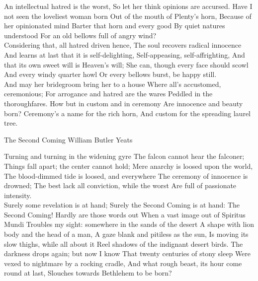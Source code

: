 \begin{poem}
 An intellectual hatred is the worst,
 So let her think opinions are accursed.
 Have I not seen the loveliest woman born
 Out of the mouth of Plenty's horn,
 Because of her opinionated mind
 Barter that horn and every good
 By quiet natures understood
 For an old bellows full of angry wind?\\

 Considering that, all hatred driven hence,
 The soul recovers radical innocence
 And learns at last that it is self-delighting,
 Self-appeasing, self-affrighting,
 And that its own sweet will is Heaven's will;
 She can, though every face should scowl
 And every windy quarter howl
 Or every bellows burst, be happy still.\\

 And may her bridegroom bring her to a house
 Where all's accustomed, ceremonious;
 For arrogance and hatred are the wares
 Peddled in the thoroughfares.
 How but in custom and in ceremony
 Are innocence and beauty born?
 Ceremony's a name for the rich horn,
 And custom for the spreading laurel tree.\\
\end{poem}

\begin{poem}
{The Second Coming}
{William Butler Yeats}

Turning and turning in the widening gyre
The falcon cannot hear the falconer;
Things fall apart; the center cannot hold;
Mere anarchy is loosed upon the world,
The blood-dimmed tide is loosed, and everywhere
The ceremony of innocence is drowned;
The best lack all conviction, while the worst
Are full of passionate intensity.\\

Surely some revelation is at hand;
Surely the Second Coming is at hand:
The Second Coming! Hardly are those words out
When a vast image out of Spiritus Mundi
Troubles my sight: somewhere in the sands of the desert
A shape with lion body and the head of a man,
A gaze blank and pitiless as the sun,
Is moving its slow thighs, while all about it
Reel shadows of the indignant desert birds.
The darkness drops again; but now I know
That twenty centuries of stony sleep
Were vexed to nightmare by a rocking cradle,
And what rough beast, its hour come round at last,
Slouches towards Bethlehem to be born?
\end{poem}

